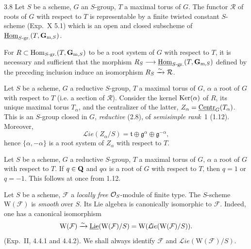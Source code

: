 \begin{proposition}{3.8}\label{XIX.3.8}
Let $S$ be a scheme, $G$ an $S$-group, $T$ a maximal torus of $G$. The functor $\mathcal R$ of roots of $G$ with respect to $T$ is representable by a finite twisted constant $S$-scheme (Exp.~X 5.1) which is an open and closed subscheme of $\underline{\operatorname{Hom}}_{S\text{-gr.}}(T,\mathbf{G}_{\mathrm m,S})$.

For $R\subset\operatorname{Hom}_{S\text{-gr.}}(T,\mathbf{G}_{\mathrm m,S})$ to be a root system of $G$ with respect to $T$, it is necessary and sufficient that the morphism $R_S\longrightarrow\underline{\operatorname{Hom}}_{S\text{-gr.}}(T,\mathbf{G}_{\mathrm m,S})$ defined by the preceding inclusion induce an isomorphism $R_S\xrightarrow{\sim}\mathcal R$.
\end{proposition}

 Let $S$ be a scheme, $G$ a reductive $S$-group, $T$ a maximal torus of $G$, $\alpha$ a root of $G$ with respect to $T$ (i.e. a section of $\mathcal R$). Consider the kernel $\operatorname{Ker}(\alpha)$ of $R$, its unique maximal torus $T_\alpha$, and the centralizer of the latter, $Z_\alpha=\underline{\mathrm{Centr}}_G(T_\alpha)$.
This is an $S$-group closed in $G$, \emph{reductive} (2.8), of \emph{semisimple rank}~1 (1.12). Moreover,
\[
\mathcal{L}\!ie(Z_\alpha/S)=\mathfrak t\oplus\mathfrak g^\alpha\oplus\mathfrak g^{-\alpha},
\]
hence $\{\alpha,-\alpha\}$ is a root system of $Z_\alpha$ with respect to $T$.

 Let $S$ be a scheme, $G$ a reductive $S$-group, $T$ a maximal torus of $G$, $\alpha$ a root of $G$ with respect to $T$. If $q\in\mathbf{Q}$ and $q\alpha$ is a root of $G$ with respect to $T$, then $q=1$ or $q=-1$. This follows at once from 1.12.

\label{XIX.sec.4}
 Let $S$ be a scheme, $\mathcal F$ a \emph{locally free} $\mathcal{O}_S$-module of finite type. The $S$-scheme $\mathrm W(\mathcal F)$ is \emph{smooth} over $S$. Its Lie algebra is canonically isomorphic to $\mathcal F$. Indeed, one has a canonical isomorphism
\[
\mathrm W(\mathcal F)\xrightarrow{\sim}\underline{\operatorname{Lie}}(\mathrm W(\mathcal F)/S)=\mathrm W(\mathcal{L}\!ie(\mathrm W(\mathcal F)/S)).
\]
(Exp.~II, 4.4.1 and 4.4.2). We shall always identify $\mathcal F$ and $\mathcal{L}\!ie(\mathrm W(\mathcal F)/S)$.

